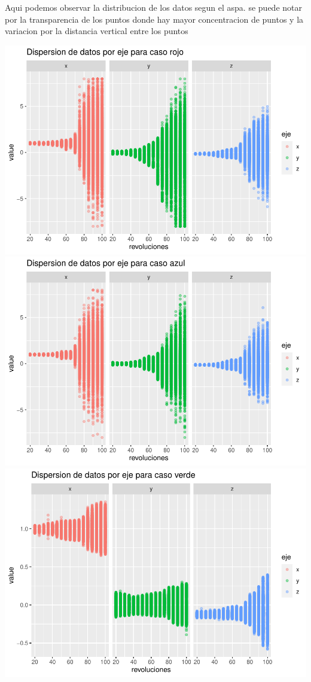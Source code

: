\documentclass[
]{article}
\begin{document}
Aqui podemos observar la distribucion de los datos segun el aspa. se
puede notar por la transparencia de los puntos donde hay mayor
concentracion de puntos y la variacion por la distancia vertical entre
los puntos

\includegraphics{EDA_files/figure-latex/unnamed-chunk-3-1.pdf}
\includegraphics{EDA_files/figure-latex/unnamed-chunk-3-2.pdf}
\includegraphics{EDA_files/figure-latex/unnamed-chunk-3-3.pdf}
\end{document}
